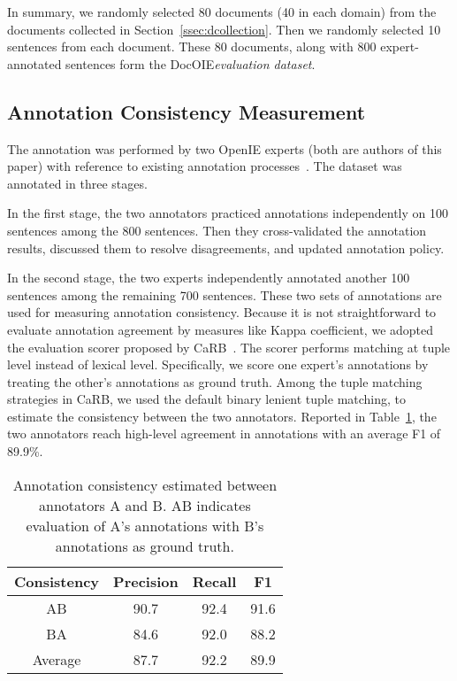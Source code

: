 \documentclass[11pt,a4paper]{article}
\newcommand{\dname}{DocOIE\xspace}
\begin{document}
In summary, we randomly selected 80 documents (40 in each domain) from the documents collected in Section~\ref{ssec:dcollection}. Then we randomly selected 10 sentences from each document. These 80 documents, along with 800 expert-annotated sentences form the \dname \textit{evaluation dataset}.












\subsection{Annotation Consistency Measurement}


The annotation was performed by two OpenIE experts (both are authors of this paper) with reference to existing annotation processes~\cite{stanovsky2016creating,bhardwaj2019carb}. The dataset was annotated in three stages. 

In the first stage, the two annotators practiced annotations independently on 100 sentences among the 800 sentences. Then they cross-validated the annotation results, discussed them to resolve disagreements, and updated annotation policy.

In the second stage, the two experts independently annotated another 100 sentences among the remaining 700 sentences. These two sets of annotations are used for measuring annotation consistency. Because it is not straightforward to evaluate annotation agreement by measures like Kappa coefficient, we adopted the evaluation scorer proposed by CaRB~\cite{bhardwaj2019carb}. The scorer performs matching at tuple level instead of lexical level. Specifically, we score one expert's annotations by treating the other's annotations as ground truth. Among the tuple matching strategies in CaRB, we used the default binary lenient tuple matching, to estimate the consistency between the two annotators. Reported in Table~\ref{tab:IAA}, the two annotators reach high-level agreement in annotations with an average F1 of 89.9\%. 

\begin{table}[t]
\centering
\begin{tabular}{ c|ccc}
 \toprule
 Consistency & Precision & Recall & F1\\
 \midrule
 AB & 90.7 &92.4 & 91.6 \\
 BA & 84.6 & 92.0 & 88.2\\
 \midrule
 Average & 87.7 & 92.2 & 89.9\\
 \bottomrule
\end{tabular}
\caption{Annotation consistency estimated between annotators A and B. AB indicates evaluation of A's annotations with B's annotations as ground truth.}
\label{tab:IAA}
\end{table}
\end{document}
